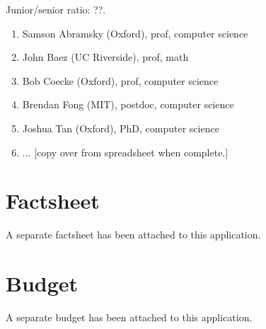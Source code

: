 \documentclass{article}
\begin{document}
Junior/senior ratio: ??.

\begin{enumerate}
\item Samson Abramsky (Oxford), prof, computer science
\item John Baez (UC Riverside), prof, math
\item Bob Coecke (Oxford), prof, computer science
\item Brendan Fong (MIT), postdoc, computer science
\item Joshua Tan (Oxford), PhD, computer science
\item ... [copy over from spreadsheet when complete.]
\end{enumerate}

\section{Factsheet}
A separate factsheet has been attached to this application.

\section{Budget}
A separate budget has been attached to this application.
\end{document}
